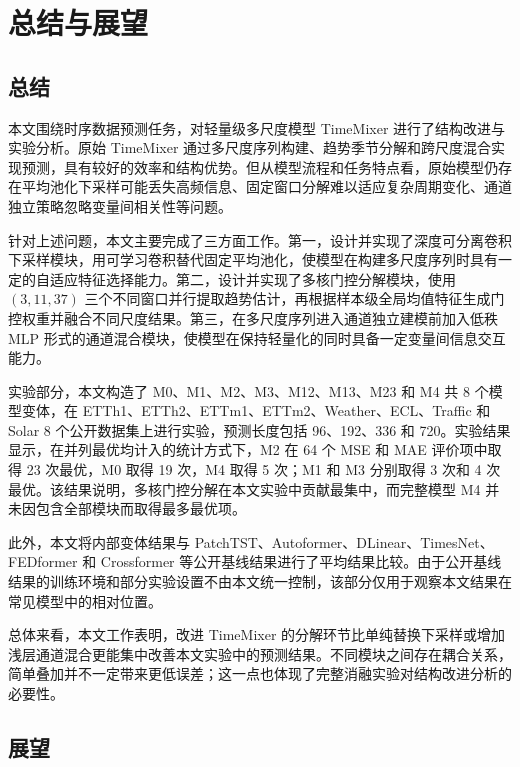 
\chapter{总结与展望}

\section{总结}

本文围绕时序数据预测任务，对轻量级多尺度模型 TimeMixer 进行了结构改进与实验分析。原始 TimeMixer 通过多尺度序列构建、趋势季节分解和跨尺度混合实现预测，具有较好的效率和结构优势。但从模型流程和任务特点看，原始模型仍存在平均池化下采样可能丢失高频信息、固定窗口分解难以适应复杂周期变化、通道独立策略忽略变量间相关性等问题。

针对上述问题，本文主要完成了三方面工作。第一，设计并实现了深度可分离卷积下采样模块，用可学习卷积替代固定平均池化，使模型在构建多尺度序列时具有一定的自适应特征选择能力。第二，设计并实现了多核门控分解模块，使用 $(3,11,37)$ 三个不同窗口并行提取趋势估计，再根据样本级全局均值特征生成门控权重并融合不同尺度结果。第三，在多尺度序列进入通道独立建模前加入低秩 MLP 形式的通道混合模块，使模型在保持轻量化的同时具备一定变量间信息交互能力。

实验部分，本文构造了 M0、M1、M2、M3、M12、M13、M23 和 M4 共 8 个模型变体，在 ETTh1、ETTh2、ETTm1、ETTm2、Weather、ECL、Traffic 和 Solar 8 个公开数据集上进行实验，预测长度包括 96、192、336 和 720。实验结果显示，在并列最优均计入的统计方式下，M2 在 64 个 MSE 和 MAE 评价项中取得 23 次最优，M0 取得 19 次，M4 取得 5 次；M1 和 M3 分别取得 3 次和 4 次最优。该结果说明，多核门控分解在本文实验中贡献最集中，而完整模型 M4 并未因包含全部模块而取得最多最优项。

此外，本文将内部变体结果与 PatchTST\cite{nie2023time}、Autoformer\cite{wu2021autoformer}、DLinear\cite{zeng2023transformers}、TimesNet\cite{wu2023timesnet}、FEDformer\cite{zhou2022fedformer} 和 Crossformer\cite{zhang2023crossformer} 等公开基线结果进行了平均结果比较。由于公开基线结果的训练环境和部分实验设置不由本文统一控制，该部分仅用于观察本文结果在常见模型中的相对位置。

总体来看，本文工作表明，改进 TimeMixer 的分解环节比单纯替换下采样或增加浅层通道混合更能集中改善本文实验中的预测结果。不同模块之间存在耦合关系，简单叠加并不一定带来更低误差；这一点也体现了完整消融实验对结构改进分析的必要性。

\section{展望}

